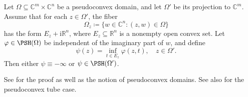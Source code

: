 \begin{proposition}\label{prop:Kis}
Let $\Omega\subseteq \mathbb{C}^m\times \mathbb{C}^n$ be a pseudoconvex domain, and let $\Omega'$ be its projection to $\mathbb{C}^m$. Assume that for each $z\in \Omega'$, the fiber
\[
    \Omega_z\coloneqq \bigl\{w\in\mathbb{C}^n: (z,w)\in \Omega \bigr\}
\]
has the form $E_z+\mathrm{i}\mathbb{R}^n$, where $E_z\subseteq \mathbb{R}^n$ is a nonempty open convex set. Let $\varphi\in \PSH(\Omega)$ be independent of the imaginary part of $w$, and define
\[
    \psi(z)=\inf_{t\in E_z}\varphi(z,t),\quad z\in \Omega'.
\]
Then either $\psi\equiv -\infty$ or $\psi\in \PSH(\Omega')$.
\end{proposition}
See \cite[Chapter~I, Section~7.B, Theorem~(7.5) and its proof, p.~57]{DemBook} for the proof as well as the notion of pseudoconvex domains. See also \cite[Corollary~11.2.6]{FPT} for the pseudoconvex tube case.

